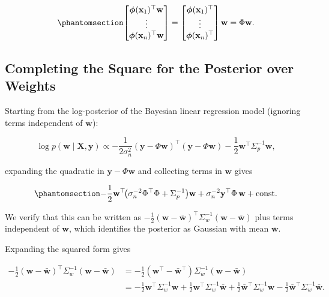 \documentclass[
  letterpaper,
  DIV=11,
  numbers=noendperiod]{scrartcl}
\begin{document}
\begin{equation}\phantomsection\label{eq-design-matrix-mean}{
\begin{bmatrix} \boldsymbol{\phi}(\mathbf{x}_1)^\top \mathbf{w} \\ \vdots \\ \boldsymbol{\phi}(\mathbf{x}_n)^\top \mathbf{w} \end{bmatrix} =
\begin{bmatrix} \boldsymbol{\phi}(\mathbf{x}_1)^\top \\ \vdots \\ \boldsymbol{\phi}(\mathbf{x}_n)^\top \end{bmatrix} \mathbf{w} = \Phi \mathbf{w}.
}\end{equation}

\subsection{Completing the Square for the Posterior over
Weights}\label{sec-completing-the-square}

Starting from the log-posterior of the Bayesian linear regression model
(ignoring terms independent of \(\mathbf{w}\)):

\[
\log p(\mathbf{w} \mid \mathbf{X}, \mathbf{y}) \propto -\frac{1}{2\sigma_n^2}(\mathbf{y} - \Phi\mathbf{w})^\top(\mathbf{y} - \Phi\mathbf{w}) - \frac{1}{2}\mathbf{w}^\top \Sigma_p^{-1}\mathbf{w},
\]

expanding the quadratic in \(\mathbf{y} - \Phi\mathbf{w}\) and
collecting terms in \(\mathbf{w}\) gives

\begin{equation}\phantomsection\label{eq-quadratic-expansion}{
-\frac{1}{2}\mathbf{w}^\top\!\bigl(\sigma_n^{-2}\Phi^\top\Phi + \Sigma_p^{-1}\bigr)\mathbf{w} + \sigma_n^{-2}\mathbf{y}^\top\Phi\,\mathbf{w} + \text{const}.
}\end{equation}

We verify that this can be written as
\(-\frac{1}{2}(\mathbf{w} - \bar{\mathbf{w}})^\top \Sigma_w^{-1} (\mathbf{w} - \bar{\mathbf{w}})\)
plus terms independent of \(\mathbf{w}\), which identifies the posterior
as Gaussian with mean \(\bar{\mathbf{w}}\).

Expanding the squared form gives

\[
\begin{aligned}
-\frac{1}{2}(\mathbf{w} - \bar{\mathbf{w}})^\top \Sigma_w^{-1} (\mathbf{w} - \bar{\mathbf{w}})
&= -\frac{1}{2}(\mathbf{w}^\top - \bar{\mathbf{w}}^\top) \Sigma_w^{-1} (\mathbf{w} - \bar{\mathbf{w}}) \\
&= -\frac{1}{2}\mathbf{w}^\top \Sigma_w^{-1} \mathbf{w} + \frac{1}{2}\mathbf{w}^\top \Sigma_w^{-1} \bar{\mathbf{w}}
  + \frac{1}{2}\bar{\mathbf{w}}^\top \Sigma_w^{-1} \mathbf{w} - \frac{1}{2}\bar{\mathbf{w}}^\top \Sigma_w^{-1} \bar{\mathbf{w}}.
\end{aligned}
\]
\end{document}
